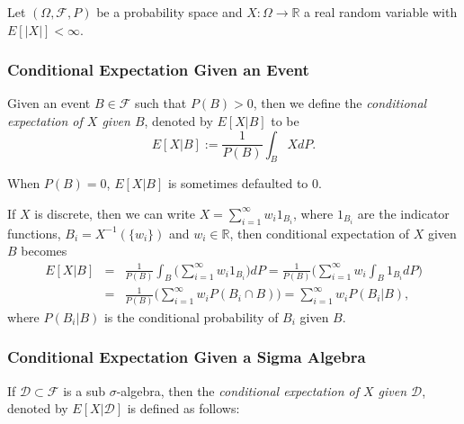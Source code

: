 \documentclass[12pt]{article}
\begin{document}
Let $(\Omega,\mathcal{F},P)$ be a probability space and $X\colon \Omega \to \mathbb{R}$ a real random variable with $E[|X|]<\infty$.

\subsubsection*{Conditional Expectation Given an Event}
Given an event $B\in \mathcal{F}$ such that $P(B)>0$, then we define the \emph{conditional expectation of $X$ given $B$}, denoted by $E[X | B]$ to be 
$$E[X | B]:=\frac{1}{P(B)}\int_B X dP.$$

When $P(B)=0$, $E[X|B]$ is sometimes defaulted to $0$.

If $X$ is discrete, then we can write $X=\sum_{i=1}^{\infty}w_i 1_{B_i}$, where $1_{B_i}$ are the indicator functions, $B_i=X^{-1}(\lbrace w_i\rbrace)$ and $w_i\in\mathbb{R}$, then conditional expectation of $X$ given $B$ becomes
\begin{eqnarray*}
E[X|B]&=&\frac{1}{P(B)}\int_B \Big( \sum_{i=1}^{\infty}w_i 1_{B_i} \Big) dP = \frac{1}{P(B)} \Big( \sum_{i=1}^{\infty}w_i \int_B 1_{B_i}  dP\Big) \\
&=& \frac{1}{P(B)} \Big( \sum_{i=1}^{\infty}w_i P(B_i\cap B) \Big) =  \sum_{i=1}^{\infty}w_i P(B_i| B),
\end{eqnarray*}
where $P(B_i|B)$ is the conditional probability of $B_i$ given $B$.

\subsubsection*{Conditional Expectation Given a Sigma Algebra}
If $\mathcal{D} \subset \mathcal{F}$ is a sub $\sigma$-algebra, then the \emph{conditional expectation of $X$ given $\mathcal{D}$}, denoted by $E[X|\mathcal{D}]$ is defined as follows$\colon$
\end{document}
